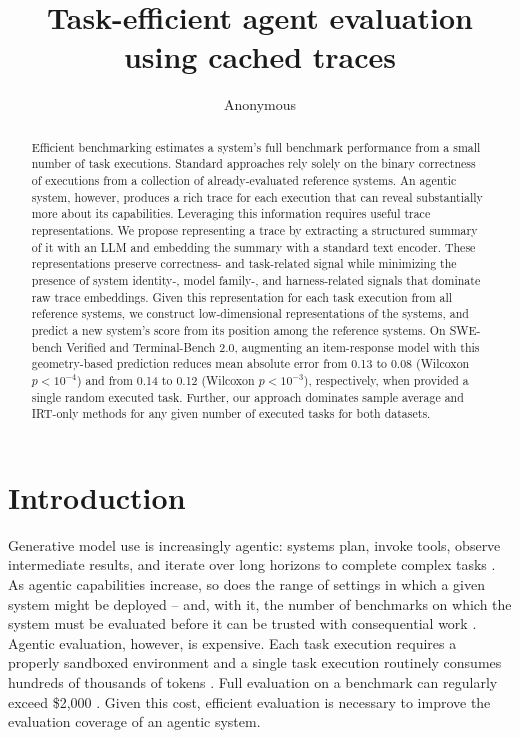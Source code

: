 \documentclass{article}
\title{Task-efficient agent evaluation using cached traces}
\author{Anonymous}
\begin{document}
\maketitle

\begin{abstract}
Efficient benchmarking estimates a system's full benchmark performance from a small number of task executions. Standard approaches rely solely on the binary correctness of executions from a collection of already-evaluated reference systems.
An agentic system, however, produces a rich trace for each execution that can reveal substantially more about its capabilities.
Leveraging this information requires useful trace representations.
We propose representing a trace by extracting a structured summary of it with an LLM and embedding the summary with a standard text encoder.
These representations preserve correctness- and task-related signal while minimizing the presence of system identity-, model family-, and harness-related signals that dominate raw trace embeddings.
Given this representation for each task execution from all reference systems, we construct low-dimensional representations of the systems, and predict a new system's score from its position among the reference systems. On SWE-bench Verified and Terminal-Bench 2.0, augmenting an item-response model with this geometry-based prediction reduces mean absolute error from 0.13 to 0.08 (Wilcoxon $ p < 10^{-4} $) and from 0.14 to 0.12 (Wilcoxon $ p < 10^{-3} $), respectively, when provided a single random executed task.
Further, our approach dominates sample average and IRT-only methods for any given number of executed tasks for both datasets.
\end{abstract}

\section{Introduction}
\label{sec:intro}

Generative model use is increasingly agentic: systems plan, invoke tools, observe intermediate results, and iterate over long horizons to complete complex tasks \citep{yang2024sweagent, wang2025openhands}.
As agentic capabilities increase, so does the range of settings in which a given system might be deployed -- and, with it, the number of benchmarks on which the system must be evaluated before it can be trusted with consequential work \citep{kapoor2025hal}.
Agentic evaluation, however, is expensive.
Each task execution requires a properly sandboxed environment and a single task execution routinely consumes hundreds of thousands of tokens \citep{jimenez2024swebench, tbench2026}.
Full evaluation on a benchmark can regularly exceed \$2{,}000 \citep{kapoor2025hal}.
Given this cost, efficient evaluation is necessary to improve the evaluation coverage of an agentic system.
\end{document}
